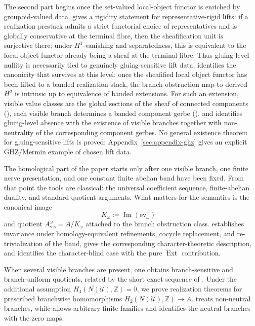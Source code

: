 The second part begins once the set-valued local-object functor is enriched by groupoid-valued data.  gives a rigidity statement for representative-rigid lifts: if a realization prestack admits a strict functorial choice of representatives and is globally conservative at the terminal fibre, then the sheafification unit is surjective there; under $H^1$-vanishing and separatedness, this is equivalent to the local object functor already being a sheaf at the terminal fibre. Thus gluing-level nullity is necessarily tied to genuinely gluing-sensitive lift data.  identifies the canonicity that survives at this level: once the sheafified local object functor has been lifted to a banded realization stack, the branch obstruction map to derived $H^2$ is intrinsic up to equivalence of banded extensions. For such an extension, visible value classes are the global sections of the sheaf of connected components (), each visible branch determines a banded component gerbe (), and  identifies gluing-level absence with the existence of visible branches together with non-neutrality of the corresponding component gerbes. No general existence theorem for gluing-sensitive lifts is proved; Appendix~\ref{sec:appendix-ghz} gives an explicit GHZ/Mermin example of chosen lift data.

The homological part of the paper starts only after one visible branch, one finite nerve presentation, and one constant finite abelian band have been fixed. From that point the tools are classical: the universal coefficient sequence, finite-abelian duality, and standard quotient arguments. What matters for the semantics is the canonical image
\[
K_\omega:=\operatorname{Im}(\mathrm{ev}_\omega)
\]
and quotient $A_{\mathrm{vis}}^\omega=A/K_\omega$ attached to the branch obstruction class.  establishes invariance under homology-equivalent refinements, cocycle replacement, and re-trivialization of the band,  gives the corresponding character-theoretic description, and  identifies the character-blind case with the pure $\operatorname{Ext}$ contribution.

When several visible branches are present, one obtains branch-sensitive and branch-uniform quotients, related by the short exact sequence of . Under the additional assumption $H_1(N(\mathcal U),\mathbb Z)\allowbreak=0$, we prove realization theorems for prescribed branchwise homomorphisms $H_2(N(\mathcal U),\mathbb Z)\allowbreak\to A$.  treats non-neutral branches, while  allows arbitrary finite families and identifies the neutral branches with the zero maps.

